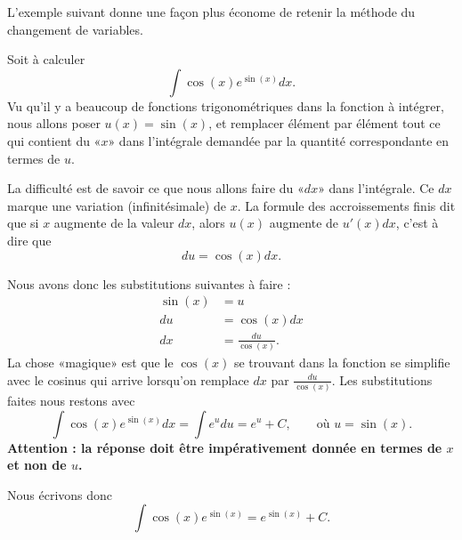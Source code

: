 L'exemple suivant donne une façon plus économe de retenir la méthode du changement de variables.
\begin{example}\label{exempleprimitivechangvar}
    Soit à calculer
    \begin{equation}
        \int \cos(x) e^{\sin(x)}dx.
    \end{equation}
    Vu qu'il y a beaucoup de fonctions trigonométriques dans la fonction à intégrer, nous allons poser \( u(x)=\sin(x)\), et remplacer élément par élément tout ce qui contient du «$x$»  dans l'intégrale demandée par la quantité correspondante en termes de \( u\).

    La difficulté est de savoir ce que nous allons faire du «\( dx\)» dans l'intégrale. Ce \( dx \) marque une variation (infinitésimale) de \( x\). La formule des accroissements finis dit que si \( x\) augmente de la valeur \( dx\), alors \( u(x)\) augmente de $u'(x)dx$, c'est à dire que
    \begin{equation}
        du=\cos(x)dx.
    \end{equation}

    Nous avons donc les substitutions suivantes à faire :
    \begin{subequations}
        \begin{align}
            \sin(x)&=u\\
            du&=\cos(x)dx\\
            dx&=\frac{ du }{ \cos(x) }.
        \end{align}
    \end{subequations}
    La chose «magique» est que le \( \cos(x)\) se trouvant dans la fonction se simplifie avec le cosinus qui arrive lorsqu'on remplace \( dx\) par \( \frac{ du }{ \cos(x) }\). Les substitutions faites nous restons avec
    \begin{equation}
        \int\cos(x) e^{\sin(x)}dx=\int e^{u}du=e^u + C, \qquad \text{où } u= \sin(x).
    \end{equation}
   {\bf Attention : la réponse doit \^etre impérativement donnée en termes de \( x\) et non de \( u\).}

    Nous écrivons donc 
    \begin{equation}
        \int \cos(x) e^{\sin(x)}= e^{\sin(x)}+C.
    \end{equation}
\end{example}

